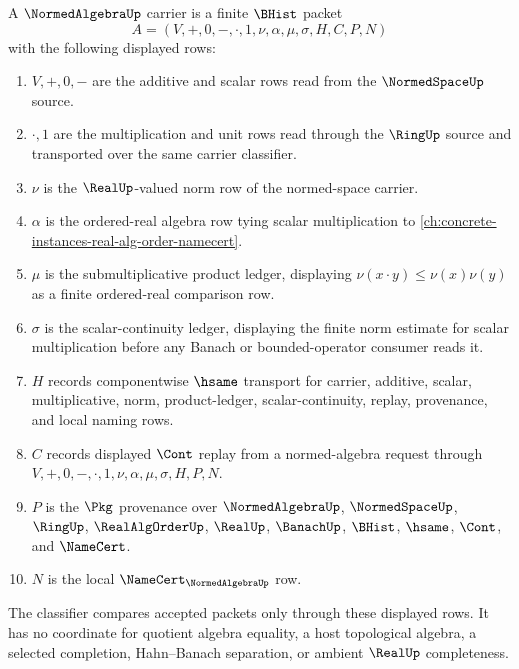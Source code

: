 \begin{definition}
\label{def:normed-algebra-namecert-surface}
A $\NormedAlgebraUp$ carrier is a finite $\BHist$ packet
$$
A=(V,+,0,-,\cdot,1,\nu,\alpha,\mu,\sigma,H,C,P,N)
$$
with the following displayed rows:
\begin{enumerate}
\item $V,+,0,-$ are the additive and scalar rows read from the $\NormedSpaceUp$ source.
\item $\cdot,1$ are the multiplication and unit rows read through the $\RingUp$ source and transported over the same carrier classifier.
\item $\nu$ is the $\RealUp$-valued norm row of the normed-space carrier.
\item $\alpha$ is the ordered-real algebra row tying scalar multiplication to \autoref{ch:concrete-instances-real-alg-order-namecert}.
\item $\mu$ is the submultiplicative product ledger, displaying $\nu(x\cdot y)\leq \nu(x)\nu(y)$ as a finite ordered-real comparison row.
\item $\sigma$ is the scalar-continuity ledger, displaying the finite norm estimate for scalar multiplication before any Banach or bounded-operator consumer reads it.
\item $H$ records componentwise $\hsame$ transport for carrier, additive, scalar, multiplicative, norm, product-ledger, scalar-continuity, replay, provenance, and local naming rows.
\item $C$ records displayed $\Cont$ replay from a normed-algebra request through $V,+,0,-,\cdot,1,\nu,\alpha,\mu,\sigma,H,P,N$.
\item $P$ is the $\Pkg$ provenance over $\NormedAlgebraUp$, $\NormedSpaceUp$, $\RingUp$, $\RealAlgOrderUp$, $\RealUp$, $\BanachUp$, $\BHist$, $\hsame$, $\Cont$, and $\NameCert$.
\item $N$ is the local $\NameCert_{\NormedAlgebraUp}$ row.
\end{enumerate}
The classifier compares accepted packets only through these displayed rows. It has no coordinate for quotient algebra equality, a host topological algebra, a selected completion, Hahn--Banach separation, or ambient $\RealUp$ completeness.
\end{definition}

